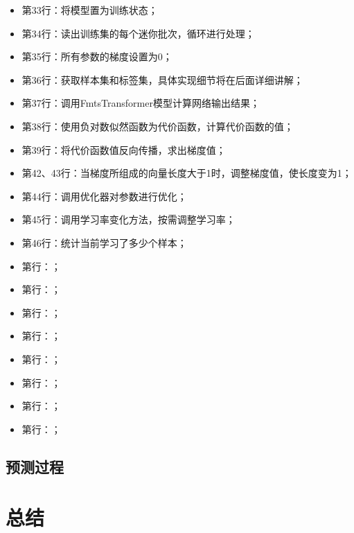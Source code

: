 \begin{itemize}
    \item 第33行：将模型置为训练状态；
    \item 第34行：读出训练集的每个迷你批次，循环进行处理；
    \item 第35行：所有参数的梯度设置为0；
    \item 第36行：获取样本集和标签集，具体实现细节将在后面详细讲解；
    \item 第37行：调用FmtsTransformer模型计算网络输出结果；
    \item 第38行：使用负对数似然函数为代价函数，计算代价函数的值；
    \item 第39行：将代价函数值反向传播，求出梯度值；
    \item 第42、43行：当梯度所组成的向量长度大于1时，调整梯度值，使长度变为1；
    \item 第44行：调用优化器对参数进行优化；
    \item 第45行：调用学习率变化方法，按需调整学习率；
    \item 第46行：统计当前学习了多少个样本；
    \item 第行：；
    \item 第行：；
    \item 第行：；
    \item 第行：；
    \item 第行：；
    \item 第行：；
    \item 第行：；
    \item 第行：；
\end{itemize}

\subsection{预测过程}

\section{总结}